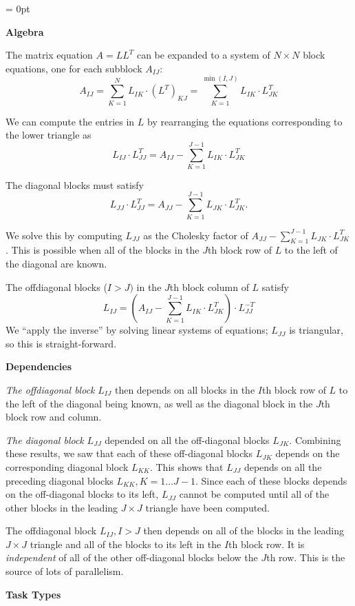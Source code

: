 \documentclass[10pt]{article}
\begin{document}
\parskip=12pt
\parindent = 0pt

{\large \bf Algebra}

The matrix equation $A = L L^T$ can be expanded to a system of $N \times N$
block equations, one for each subblock $A_{IJ}$:
\[  A_{IJ} = \sum_{K=1}^{N} L_{IK} \cdot (L^T)_{KJ} 
= \sum_{K=1}^{\min (I,J)} L_{IK} \cdot L_{JK}^T \]
  
We can compute the entries in $L$ by rearranging the equations corresponding to
the lower triangle as
\[ L_{IJ} \cdot L_{JJ}^T = A_{IJ} - 
\sum_{K=1}^{J-1} L_{IK} \cdot L_{JK}^T \]

The diagonal blocks must satisfy
\[ L_{JJ} \cdot L_{JJ}^T = A_{JJ} - 
\sum_{K=1}^{J-1} L_{JK} \cdot L_{JK}^T. \] 

We solve this by computing $L_{JJ}$ as the Cholesky factor of $A_{JJ} -
\sum_{K=1}^{J-1} L_{JK} \cdot L_{JK}^T$.  This is possible when all of the
blocks in the $J$th block row of $L$ to the left of the diagonal are known.

The offdiagonal blocks ($I > J)$ in the  $J$th block column of $L$ satisfy
\[ L_{IJ} = ( A_{IJ} - \sum_{K=1}^{J-1} L_{IK} \cdot L_{JK}^T) 
\cdot L_{JJ}^{-T}  \]
We ``apply the inverse'' by solving linear systems of equations; $L_{JJ}$ is
triangular, so this is straight-forward.  

{\large \bf Dependencies}

\emph{The offdiagonal block} $L_{IJ}$ then depends on all blocks in
the $I$th block row of $L$ to the left of the diagonal being known, as
well as the diagonal block in the $J$th block row and column.

\emph{The diagonal block} $L_{JJ}$ depended on all the off-diagonal
blocks $L_{JK}$.  Combining these results, we saw that each of these
off-diagonal blocks $L_{JK}$ depends on the corresponding diagonal
block $L_{KK}$.  This shows that $L_{JJ}$ depends on all the preceding
diagonal blocks $L_{KK}, K = 1 \ldots J-1$.  Since each of these
blocks depends on the off-diagonal blocks to its left, $L_{JJ}$ cannot
be computed until all of the other blocks in the leading $J \times J$
triangle have been computed.

The offdiagonal block $L_{IJ}, I > J$ then depends on all of the blocks in the
leading $J \times J$ triangle and all of the blocks to its left in the
$I$th block row.  It is \emph{independent} of all of the other off-diagonal
blocks below the $J$th row.  This is the source of lots of parallelism.

{\large \bf Task Types}
\end{document}
